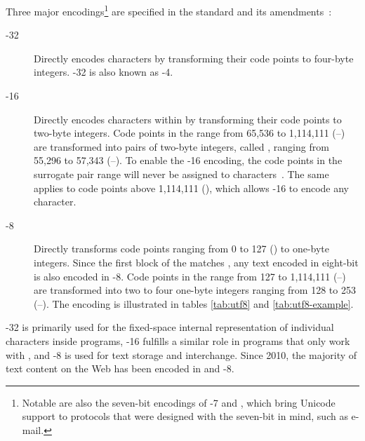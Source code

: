 Three major encodings\footnote{
  Notable are also the seven-bit encodings of -7
   and , which bring
  Unicode support to protocols that were designed with the seven-bit
   in mind, such as e-mail.}
are specified in the  standard and its
amendments~\cite{iso93:am1,iso93:am2}:
\begin{description}
  \item[-32]Directly
    encodes  characters by transforming their code points to
    four-byte integers. -32 is also known as
    -4.
  \item[-16]
    Directly encodes characters within  by transforming their code
    points to two-byte integers. Code points in the range from 65,536 to
    1,114,111 (\mbox{--}) are transformed into pairs
    of two-byte integers, called , ranging from
    55,296 to 57,343 (\mbox{--}). To enable the
    -16 encoding, the code points in the surrogate pair range
    will never be assigned to characters~\cite[sec.\,3.4, D15]{unicode16}. The
    same applies to code points above 1,114,111 (), which allows
    -16 to encode any  character.
  \item[-8]
    Directly transforms code points ranging from 0 to 127 () to
    one-byte integers. Since the first  block of the
     matches , any text encoded in eight-bit
     is also encoded in -8. Code points in the
    range from 127 to 1,114,111 (\mbox{--}) are
    transformed into two to four one-byte integers ranging from 128 to 253
    (\mbox{--}). The encoding is illustrated in tables
    \ref{tab:utf8} and \ref{tab:utf8-example}.
\end{description}
-32 is primarily used for the fixed-space internal representation
of individual  characters inside programs, -16
fulfills a similar role in programs that only work with , and
-8 is used for text storage and interchange. Since 2010, the
majority of text content on the Web has been encoded in  and
-8.~\cite{qsuccess15}

